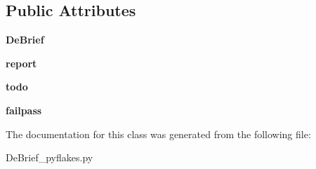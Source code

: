 \subsection*{Public Attributes}
\begin{DoxyCompactItemize}
\item 
\hypertarget{classc_1_1_de_brief__pyflakes_1_1_de_brief_ae54dd391306933f3851bf605b42bf560}{}{\bfseries De\+Brief}\label{classc_1_1_de_brief__pyflakes_1_1_de_brief_ae54dd391306933f3851bf605b42bf560}

\item 
\hypertarget{classc_1_1_de_brief__pyflakes_1_1_de_brief_a72befaed2ab2429649b2c90315f95b71}{}{\bfseries report}\label{classc_1_1_de_brief__pyflakes_1_1_de_brief_a72befaed2ab2429649b2c90315f95b71}

\item 
\hypertarget{classc_1_1_de_brief__pyflakes_1_1_de_brief_a01eb376d95498c63ddeada1d6ed5c323}{}{\bfseries todo}\label{classc_1_1_de_brief__pyflakes_1_1_de_brief_a01eb376d95498c63ddeada1d6ed5c323}

\item 
\hypertarget{classc_1_1_de_brief__pyflakes_1_1_de_brief_a6a13b550f1456aeedcd79b5ae00e30b8}{}{\bfseries failpass}\label{classc_1_1_de_brief__pyflakes_1_1_de_brief_a6a13b550f1456aeedcd79b5ae00e30b8}

\end{DoxyCompactItemize}


The documentation for this class was generated from the following file\+:\begin{DoxyCompactItemize}
\item 
De\+Brief\+\_\+pyflakes.\+py\end{DoxyCompactItemize}
